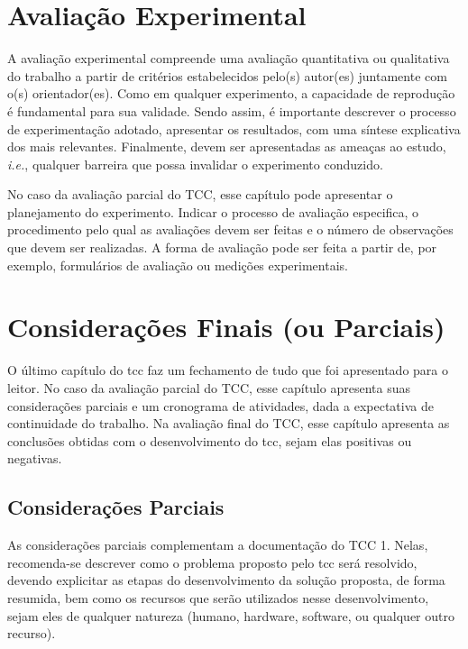 \documentclass{eic-bcc-tcc}
\begin{document}
\chapter{Avaliação Experimental}
\label{cha:avaliacao}

A avaliação experimental compreende uma avaliação quantitativa ou qualitativa do trabalho a partir de critérios estabelecidos pelo(s) autor(es) juntamente com o(s) orientador(es). Como em qualquer experimento, a capacidade de reprodução é fundamental para sua validade. Sendo assim, é importante descrever o processo de experimentação adotado, apresentar os resultados, com uma síntese explicativa dos mais relevantes. Finalmente, devem ser apresentadas as ameaças ao estudo, \textit{i.e.}, qualquer barreira que possa invalidar o experimento conduzido.

No caso da avaliação parcial do TCC, esse capítulo pode apresentar o planejamento do experimento. Indicar o processo de avaliação especifica, o procedimento pelo qual as avaliações devem ser feitas e o número de observações que devem ser realizadas. A forma de avaliação pode ser feita a partir de, por exemplo, formulários de avaliação ou medições experimentais.


\chapter{Considerações Finais (ou Parciais)}
\label{cha:conclusao}

O último capítulo do \gls{tcc} faz um fechamento de tudo que foi apresentado para o leitor. No caso da avaliação parcial do TCC, esse capítulo apresenta suas considerações parciais e um cronograma de atividades, dada a expectativa de continuidade do trabalho. Na avaliação final do TCC, esse capítulo apresenta as conclusões obtidas com o desenvolvimento do \gls{tcc}, sejam elas positivas ou negativas.


\section{Considerações Parciais}

As considerações parciais complementam a documentação do TCC 1. Nelas, recomenda-se descrever como o problema proposto pelo \gls{tcc} será resolvido, devendo explicitar as etapas do desenvolvimento da solução proposta, de forma resumida, bem como os recursos que serão utilizados nesse desenvolvimento, sejam eles de qualquer natureza (humano, hardware, software, ou qualquer outro recurso).
\end{document}
